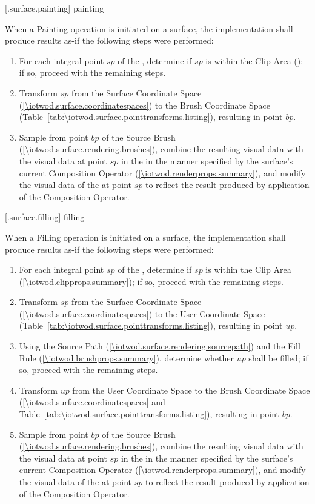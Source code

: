  [\iotwod.surface.painting] { painting}

\pnum
When a Painting operation is initiated on a surface, the implementation shall produce results as-if the following steps were performed:

\begin{enumerate}
\item For each integral point $sp$ of the \underlyingsurface, determine if $sp$ is within the Clip Area (); if so, proceed with the remaining steps.
\item Transform $sp$ from the Surface Coordinate Space (\ref{\iotwod.surface.coordinatespaces}) to the Brush Coordinate Space (Table~\ref{tab:\iotwod.surface.pointtransforms.listing}), resulting in point $bp$.
\item Sample from point $bp$ of the Source Brush (\ref{\iotwod.surface.rendering.brushes}), combine the resulting visual data with the visual data at point $sp$ in the \underlyingsurface in the manner specified by the surface's current Composition Operator (\ref{\iotwod.renderprops.summary}), and modify the visual data of the \underlyingsurface at point $sp$ to reflect the result produced by application of the Composition Operator.
\end{enumerate}

 [\iotwod.surface.filling] { filling}

\pnum
When a Filling operation is initiated on a surface, the implementation shall produce results as-if the following steps were performed:

\begin{enumerate}
\item For each integral point $sp$ of the \underlyingsurface, determine if $sp$ is within the Clip Area (\ref{\iotwod.clipprops.summary}); if so, proceed with the remaining steps.
\item Transform $sp$ from the Surface Coordinate Space (\ref{\iotwod.surface.coordinatespaces}) to the User Coordinate Space (Table~\ref{tab:\iotwod.surface.pointtransforms.listing}), resulting in point $up$.
\item Using the Source Path (\ref{\iotwod.surface.rendering.sourcepath}) and the Fill Rule (\ref{\iotwod.brushprops.summary}), determine whether $up$ shall be filled; if so, proceed with the remaining steps.
\item Transform $up$ from the User Coordinate Space to the Brush Coordinate Space (\ref{\iotwod.surface.coordinatespaces} and Table~\ref{tab:\iotwod.surface.pointtransforms.listing}), resulting in point $bp$.
\item Sample from point $bp$ of the Source Brush (\ref{\iotwod.surface.rendering.brushes}), combine the resulting visual data with the visual data at point $sp$ in the \underlyingsurface in the manner specified by the surface's current Composition Operator (\ref{\iotwod.renderprops.summary}), and modify the visual data of the \underlyingsurface at point $sp$ to reflect the result produced by application of the Composition Operator.
\end{enumerate}

